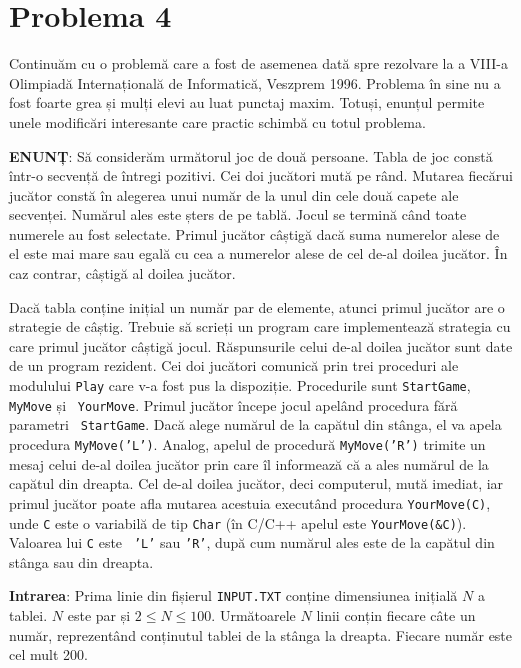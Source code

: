 \section{Problema 4}

Continuăm cu o problemă care a fost de asemenea dată spre rezolvare la a
VIII-a Olimpiadă Internațională de Informatică, Veszprem 1996. Problema în
sine nu a fost foarte grea și mulți elevi au luat punctaj maxim. Totuși,
enunțul permite unele modificări interesante care practic schimbă cu totul
problema.

{\bf ENUNȚ}: Să considerăm următorul joc de două persoane. Tabla de joc constă
într-o secvență de întregi pozitivi. Cei doi jucători mută pe rând. Mutarea
fiecărui jucător constă în alegerea unui număr de la unul din cele două capete
ale secvenței. Numărul ales este șters de pe tablă. Jocul se termină când
toate numerele au fost selectate. Primul jucător câștigă dacă suma numerelor
alese de el este mai mare sau egală cu cea a numerelor alese de cel de-al
doilea jucător. În caz contrar, câștigă al doilea jucător.

Dacă tabla conține inițial un număr par de elemente, atunci primul jucător are
o strategie de câștig. Trebuie să scrieți un program care implementează
strategia cu care primul jucător câștigă jocul. Răspunsurile celui de-al
doilea jucător sunt date de un program rezident. Cei doi jucători comunică
prin trei proceduri ale modulului {\tt Play} care v-a fost pus la
dispoziție. Procedurile sunt {\tt StartGame}, {\tt MyMove} și {\tt
  YourMove}. Primul jucător începe jocul apelând procedura fără parametri {\tt
  StartGame}. Dacă alege numărul de la capătul din stânga, el va apela
procedura {\tt MyMove('L')}. Analog, apelul de procedură {\tt MyMove('R')}
trimite un mesaj celui de-al doilea jucător prin care îl informează că a ales
numărul de la capătul din dreapta. Cel de-al doilea jucător, deci computerul,
mută imediat, iar primul jucător poate afla mutarea acestuia executând
procedura {\tt YourMove(C)}, unde {\tt C} este o variabilă de tip {\tt Char}
(în C/C++ apelul este {\tt YourMove(\&C)}). Valoarea lui {\tt C} este {\tt
  'L'} sau {\tt 'R'}, după cum numărul ales este de la capătul din stânga sau
din dreapta.

{\bf Intrarea}: Prima linie din fișierul {\tt INPUT.TXT} conține dimensiunea
inițială $N$ a tablei. $N$ este par și $2 \leq N \leq 100$. Următoarele $N$
linii conțin fiecare câte un număr, reprezentând conținutul tablei de la
stânga la dreapta. Fiecare număr este cel mult 200.

